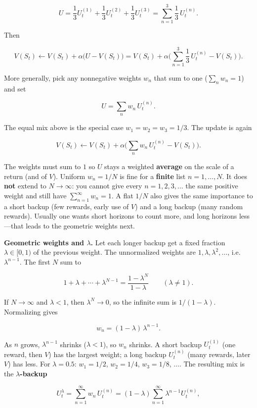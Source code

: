 \[
U
=
\frac{1}{3}U_t^{(1)}+\frac{1}{3}U_t^{(2)}+\frac{1}{3}U_t^{(3)}
=
\sum_{n=1}^{3}\frac{1}{3}\,U_t^{(n)}.
\]

Then

\[
V(S_t)\leftarrow V(S_t)+\alpha\bigl(U-V(S_t)\bigr)
=
V(S_t)+\alpha\Biggl(\sum_{n=1}^{3}\frac{1}{3}\,U_t^{(n)}-V(S_t)\Biggr).
\]

More generally, pick any nonnegative weights $w_n$ that sum to one ($\sum_n w_n=1$) and set

\[
U=\sum_{n} w_n\,U_t^{(n)}.
\]

The equal mix above is the special case $w_1=w_2=w_3=1/3$. The update is again

\[
V(S_t)\leftarrow V(S_t)+\alpha\Biggl(\sum_{n} w_n\,U_t^{(n)}-V(S_t)\Biggr).
\]

The weights must sum to $1$ so $U$ stays a weighted \textbf{average} on the scale of a return (and of $V$). Uniform $w_n=1/N$ is fine for a \textbf{finite} list $n=1,\ldots,N$. It does \textbf{not} extend to $N\to\infty$: you cannot give every $n=1,2,3,\ldots$ the same positive weight and still have $\sum_{n=1}^{\infty} w_n=1$. A flat $1/N$ also gives the same importance to a short backup (few rewards, early use of $V$) and a long backup (many random rewards). Usually one wants short horizons to count more, and long horizons less---that leads to the geometric weights next.

\textbf{Geometric weights and $\lambda$.} Let each longer backup get a fixed fraction $\lambda\in[0,1)$ of the previous weight. The unnormalized weights are $1,\lambda,\lambda^2,\ldots$, i.e. $\lambda^{n-1}$. The first $N$ sum to

\[
1+\lambda+\cdots+\lambda^{N-1}=\frac{1-\lambda^N}{1-\lambda}\qquad(\lambda\neq 1).
\]

If $N\to\infty$ and $\lambda<1$, then $\lambda^N\to 0$, so the infinite sum is $1/(1-\lambda)$. Normalizing gives

\[
w_n=(1-\lambda)\,\lambda^{n-1}.
\]

As $n$ grows, $\lambda^{n-1}$ shrinks ($\lambda<1$), so $w_n$ shrinks. A short backup $U_t^{(1)}$ (one reward, then $V$) has the largest weight; a long backup $U_t^{(n)}$ (many rewards, later $V$) has less. For $\lambda=0.5$: $w_1=1/2$, $w_2=1/4$, $w_3=1/8$, $\ldots$. The resulting mix is the \textbf{$\lambda$-backup}

\begin{equation}
U_t^{\lambda}
=
\sum_{n=1}^{\infty} w_n\,U_t^{(n)}
=
(1-\lambda)\sum_{n=1}^{\infty}\lambda^{n-1}U_t^{(n)},
\tag{5.4}
\end{equation}

